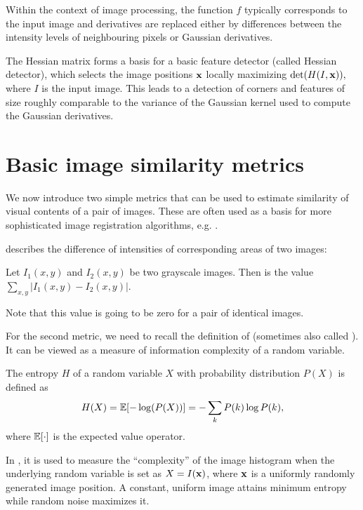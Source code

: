 Within the context of image processing, the function $f$ typically corresponds to the input image and derivatives are replaced either by differences between the intensity levels of neighbouring pixels or Gaussian derivatives. 

The Hessian matrix forms a basis for a basic feature detector (called Hessian detector), which selects the image positions $\mathbf{x}$ locally maximizing $\det(H(I, \mathbf{x})),$ where $I$ is the input image.
This leads to a detection of corners and features of size roughly comparable to the variance of the Gaussian kernel used to compute the Gaussian derivatives. %

\section{Basic image similarity metrics} %

We now introduce two simple metrics that can be used to estimate similarity of visual contents of a pair of images. 
These are often used as a basis for more sophisticated image registration algorithms, e.g. \cite{hirschmuller2008}.

 describes the difference of intensities of corresponding areas of two images: 
\begin{definition} 
Let $I_1(x, y)$ and $I_2(x, y)$ be two grayscale images. 
Then  is the value $\sum_{x, y} |I_1(x, y) - I_2(x, y)|$. 
\end{definition} 
Note that this value is going to be zero for a pair of identical images.

For the second metric, %
we need to recall the definition of  (sometimes also called ). 
It can be viewed as a measure of information complexity of a random variable. 
\begin{definition} 
The entropy $H$ of a random variable $X$ with probability distribution $P(X)$ is defined as %
\begin{align*}
  H(X) = \mathbb{E}[-\log(P(X))] = -\sum_k{P(k)\log P(k)},
\end{align*}
where $\mathbb{E}[\cdot]$ is the expected value operator.
\end{definition}
In \cv, it is used to measure the ``complexity'' of the image histogram when the underlying random variable is set as $X = I(\mathbf{x})$, where $\mathbf{x}$ is a uniformly randomly generated image position. 
A constant, uniform image attains minimum entropy while random noise maximizes it. 

